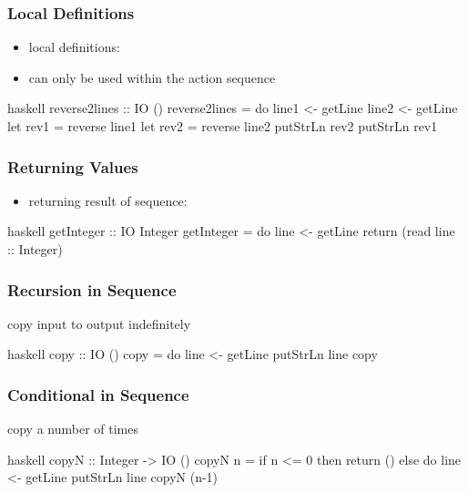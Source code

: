\documentclass[dvipsnames]{beamer}
\theoremstyle{plain}
\begin{document}
\begin{frame}[fragile]
  \frametitle{Local Definitions}

  \begin{itemize}
    \item local definitions: 
    \item can only be used within the action sequence
  \end{itemize}

  \begin{exampleblock}{}
    \begin{pygments}{haskell}
reverse2lines :: IO ()
reverse2lines = do line1 <- getLine
                   line2 <- getLine
                   let rev1 = reverse line1
                   let rev2 = reverse line2
                   putStrLn rev2
                   putStrLn rev1
    \end{pygments}
  \end{exampleblock}
\end{frame}

\begin{frame}[fragile]
  \frametitle{Returning Values}

  \begin{itemize}
    \item returning result of sequence: 
  \end{itemize}

  \begin{exampleblock}{}
    \begin{pygments}{haskell}
getInteger :: IO Integer
getInteger = do line <- getLine
                return (read line :: Integer)
    \end{pygments}
  \end{exampleblock}
\end{frame}

\begin{frame}[fragile]
  \frametitle{Recursion in Sequence}

  \begin{exampleblock}{copy input to output indefinitely}
    \begin{pygments}{haskell}
copy :: IO ()
copy = do line <- getLine
          putStrLn line
          copy
    \end{pygments}
  \end{exampleblock}
\end{frame}

\begin{frame}[fragile]
  \frametitle{Conditional in Sequence}

  \begin{exampleblock}{copy a number of times}
    \begin{pygments}{haskell}
copyN :: Integer -> IO ()
copyN n =
    if n <= 0
        then return ()
        else do line <- getLine
                putStrLn line
                copyN (n-1)
    \end{pygments}
  \end{exampleblock}
\end{frame}
\end{document}
